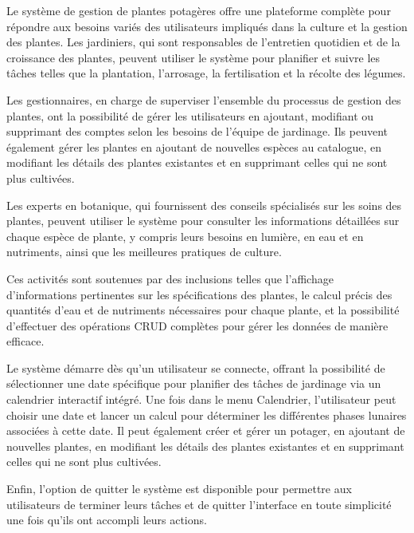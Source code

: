 Le système de gestion de plantes potagères offre une plateforme complète pour répondre aux besoins variés des utilisateurs impliqués dans la culture et la gestion des plantes. Les jardiniers, qui sont responsables de l'entretien quotidien et de la croissance des plantes, peuvent utiliser le système pour planifier et suivre les tâches telles que la plantation, l'arrosage, la fertilisation et la récolte des légumes.

Les gestionnaires, en charge de superviser l'ensemble du processus de gestion des plantes, ont la possibilité de gérer les utilisateurs en ajoutant, modifiant ou supprimant des comptes selon les besoins de l'équipe de jardinage. Ils peuvent également gérer les plantes en ajoutant de nouvelles espèces au catalogue, en modifiant les détails des plantes existantes et en supprimant celles qui ne sont plus cultivées.

Les experts en botanique, qui fournissent des conseils spécialisés sur les soins des plantes, peuvent utiliser le système pour consulter les informations détaillées sur chaque espèce de plante, y compris leurs besoins en lumière, en eau et en nutriments, ainsi que les meilleures pratiques de culture.

Ces activités sont soutenues par des inclusions telles que l'affichage d'informations pertinentes sur les spécifications des plantes, le calcul précis des quantités d'eau et de nutriments nécessaires pour chaque plante, et la possibilité d'effectuer des opérations CRUD complètes pour gérer les données de manière efficace.

Le système démarre dès qu'un utilisateur se connecte, offrant la possibilité de sélectionner une date spécifique pour planifier des tâches de jardinage via un calendrier interactif intégré. Une fois dans le menu Calendrier, l'utilisateur peut choisir une date et lancer un calcul pour déterminer les différentes phases lunaires associées à cette date. Il peut également créer et gérer un potager, en ajoutant de nouvelles plantes, en modifiant les détails des plantes existantes et en supprimant celles qui ne sont plus cultivées.

Enfin, l'option de quitter le système est disponible pour permettre aux utilisateurs de terminer leurs tâches et de quitter l'interface en toute simplicité une fois qu'ils ont accompli leurs actions.
